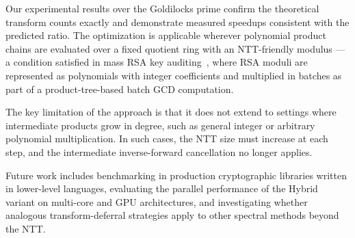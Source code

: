 \documentclass[runningheads]{llncs}
\begin{document}
Our experimental results over the Goldilocks prime confirm the theoretical transform counts exactly and demonstrate measured speedups consistent with the predicted ratio. The optimization is applicable wherever polynomial product chains are evaluated over a fixed quotient ring with an NTT-friendly modulus --- a condition satisfied in mass RSA key auditing~\cite{heninger2012mining}, where RSA moduli are represented as polynomials with integer coefficients and multiplied in batches as part of a product-tree-based batch GCD computation.

The key limitation of the approach is that it does not extend to settings where intermediate products grow in degree, such as general integer or arbitrary polynomial multiplication. In such cases, the NTT size must increase at each step, and the intermediate inverse-forward cancellation no longer applies.

Future work includes benchmarking in production cryptographic libraries written in lower-level languages, evaluating the parallel performance of the Hybrid variant on multi-core and GPU architectures, and investigating whether analogous transform-deferral strategies apply to other spectral methods beyond the NTT.
\end{document}
